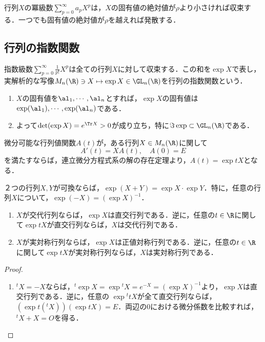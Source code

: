 \documentclass[uplatex, dvipdfmx]{jsreport}
\begin{document}
\begin{theorem}
    行列$X$の冪級数$\sum_{p=0}^\infty a_pX^p$は，$X$の固有値の絶対値が$\rho$より小さければ収束する．一つでも固有値の絶対値が$\rho$を越えれば発散する．
\end{theorem}

\subsection{行列の指数関数}

\begin{example}
    指数級数$\sum_{p=0}^\infty\frac{1}{p!}X^p$は全ての行列$X$に対して収束する．この和を$\exp X$で表し，実解析的な写像$M_n(\R)\ni X\mapsto\exp X\in \GL_n(\R)$を行列の指数関数という．
    \begin{enumerate}
        \item $X$の固有値を$\al_1,\cdots,\al_n$とすれば，$\exp X$の固有値は$\exp(\al_1),\cdots,\exp(\al_n)$である．
        \item よって$\det(\exp X)=e^{\Tr X}>0$が成り立ち，特に$\Im\exp\subset\GL_n(\R)$である．
    \end{enumerate}
\end{example}

\begin{remark}
    微分可能な行列値関数$A(t)$が，ある行列$X\in M_n(\R)$に関して
    \[A'(t)=XA(t),\quad A(0)=E\]
    を満たすならば，連立微分方程式系の解の存在定理より，$A(t)=\exp tX$となる．
\end{remark}

\begin{proposition}[加法定理]
    ２つの行列$X,Y$が可換ならば，$\exp(X+Y)=\exp X\cdot\exp Y$．特に，任意の行列$X$について，$\exp(-X)=(\exp X)^{-1}$．
\end{proposition}

\begin{proposition}\mbox{}
    \begin{enumerate}
        \item $X$が交代行列ならば，$\exp X$は直交行列である．逆に，任意の$t\in\R$に関して$\exp tX$が直交行列ならば，$X$は交代行列である．
        \item $X$が実対称行列ならば，$\exp X$は正値対称行列である．逆に，任意の$t\in\R$に関して$\exp tX$が実対称行列ならば，$X$は実対称行列である．
    \end{enumerate}
\end{proposition}
\begin{proof}\mbox{}
    \begin{enumerate}
        \item ${}^t\!X=-X$ならば，${}^t\!\exp X=\exp{}^t\!X=e^{-X}=(\exp X)^{-1}$より，$\exp X$は直交行列である．逆に，任意の
        $\exp{}^ttX$が全て直交行列ならば，$(\exp t({}^t\!X))(\exp tX)=E$．両辺の$0$における微分係数を比較すれば，${}^t\!X+X=O$を得る．
    \end{enumerate}
\end{proof}
\end{document}
